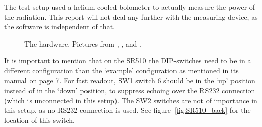 The test setup used a helium-cooled bolometer to actually measure the power of the radiation. This report will not deal any further with the measuring device, as the software is independent of that.


\begin{figure}[h!tb]
	\begin{center}
		\qquad
		\qquad
		\caption{The hardware. Pictures from \cite{PI}, \cite{SR}, and \cite{prologix}.}
		\label{fig:hardware}
	\end{center}
\end{figure}

It is important to mention that on the SR510 the DIP-switches need to be in a different configuration than the `example' configuration as mentioned in its manual on page 7. For fast readout, SW1 switch 6 should be in the `up' position instead of in the `down' position, to suppress echoing over the RS232 connection (which is unconnected in this setup). The SW2 switches are not of importance in this setup, as no RS232 connection is used. See figure~\ref{fig:SR510_back} for the location of this switch.


